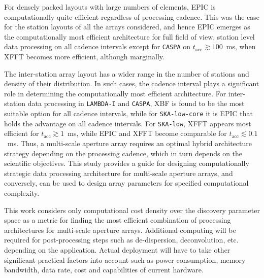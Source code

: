 \documentclass[
  journal=pasa,
  manuscript=article-type,
  year=2020,
  volume=37,
]{cup-journal}
\begin{document}
For densely packed layouts with large numbers of elements, EPIC is computationally quite efficient regardless of processing cadence. This was the case for the station layouts of all the arrays considered, and hence EPIC emerges as the computationally most efficient architecture for full field of view, station level data processing on all cadence intervals except for \texttt{CASPA} on $t_\textrm{acc}\gtrsim 100$~ms, when XFFT becomes more efficient, although marginally. 

The inter-station array layout has a wider range in the number of stations and density of their distribution. In such cases, the cadence interval plays a significant role in determining the computationally most efficient architecture. For inter-station data processing in \texttt{LAMBDA-I} and \texttt{CASPA}, XBF is found to be the most suitable option for all cadence intervals, while for \texttt{SKA-low-core} it is EPIC that holds the advantage on all cadence intervals. For \texttt{SKA-low}, XFFT appears most efficient for $t_\textrm{acc}\gtrsim 1$~ms, while EPIC and XFFT become comparable for $t_\textrm{acc}\lesssim 0.1$~ms. Thus, a multi-scale aperture array requires an optimal hybrid architecture strategy depending on the processing cadence, which in turn depends on the scientific objectives. This study provides a guide for designing computationally strategic data processing architecture for multi-scale aperture arrays, and conversely, can be used to design array parameters for specified computational complexity. 

This work considers only computational cost density over the discovery parameter space as a metric for finding the most efficient combination of processing architectures for multi-scale aperture arrays. Additional computing will be required for post-processing steps such as de-dispersion, deconvolution, etc. depending on the application. Actual deployment will have to take other significant practical factors into account such as power consumption, memory bandwidth, data rate, cost and capabilities of current hardware.

\end{document}
